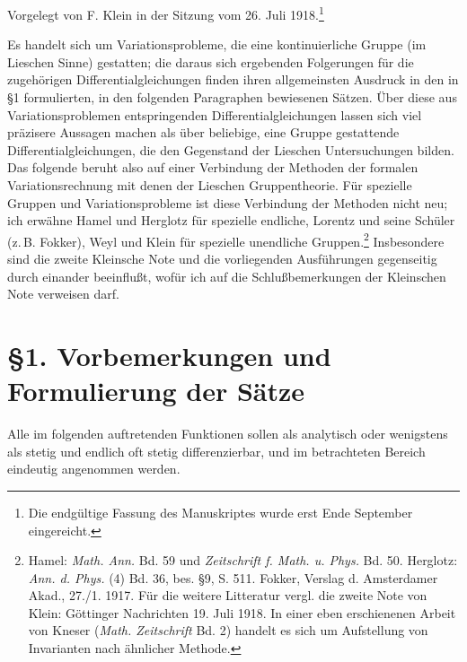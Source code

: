 \documentclass[11pt]{article}
\begin{document}
\vspace{3em}
\begin{center}
Vorgelegt von F. Klein in der Sitzung vom 26. Juli 1918.\footnote{Die endgültige Fassung des Manuskriptes wurde erst Ende September eingereicht.}
\end{center}

Es handelt sich um Variationsprobleme, die eine kontinuierliche Gruppe (im Lieschen Sinne) gestatten; die daraus sich ergebenden Folgerungen für die zugehörigen Differentialgleichungen finden ihren allgemeinsten Ausdruck in den in \S{}1 formulierten, in den folgenden Paragraphen bewiesenen Sätzen. Über diese aus Variationsproblemen entspringenden Differentialgleichungen lassen sich viel präzisere Aussagen machen als über beliebige, eine Gruppe gestattende Differentialgleichungen, die den Gegenstand der Lieschen Untersuchungen bilden. Das folgende beruht also auf einer Verbindung der Methoden der formalen Variationsrechnung mit denen der Lieschen Gruppentheorie. Für spezielle Gruppen und Variationsprobleme ist diese Verbindung der Methoden nicht neu; ich erwähne Hamel und Herglotz für spezielle endliche, Lorentz und seine Schüler (z.\,B. Fokker), Weyl und Klein für spezielle unendliche Gruppen.\footnote{Hamel: \emph{Math. Ann.} Bd. 59 und \emph{Zeitschrift f. Math. u. Phys.} Bd. 50. Herglotz: \emph{Ann. d. Phys.} (4) Bd. 36, bes. \S{}9, S. 511. Fokker, Verslag d. Amsterdamer Akad., 27./1. 1917. Für die weitere Litteratur vergl. die zweite Note von Klein: Göttinger Nachrichten 19. Juli 1918. In einer eben erschienenen Arbeit von Kneser (\emph{Math. Zeitschrift} Bd. 2) handelt es sich um Aufstellung von Invarianten nach ähnlicher Methode.} Insbesondere sind die zweite Kleinsche Note und die vorliegenden Ausführungen gegenseitig durch einander beeinflußt, wofür ich auf die Schlußbemerkungen der Kleinschen Note verweisen darf.

\section*{\S{}1. Vorbemerkungen und Formulierung der Sätze}

Alle im folgenden auftretenden Funktionen sollen als analytisch oder wenigstens als stetig und endlich oft stetig differenzierbar, und im betrachteten Bereich eindeutig angenommen werden.
\end{document}
